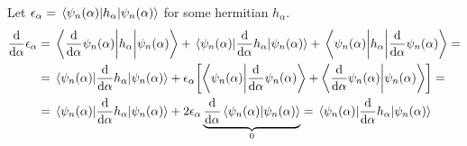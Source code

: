 \begin{theorem}
	Let $\epsilon_\alpha = \ev{h_\alpha}{\psi_n(\alpha)}$ for some hermitian $h_\alpha$.
	\begin{align}
	\dv{\alpha} \epsilon_\alpha  &=  \mel{\dv{\alpha}\psi_n(\alpha)}{h_\alpha}{\psi_n(\alpha)} + \mel{\psi_n(\alpha)}{\dv{\alpha}h_\alpha}{\psi_n(\alpha)} + \mel{\psi_n(\alpha)}{h_\alpha}{\dv{\alpha}\psi_n(\alpha)} =\\&= \mel{\psi_n(\alpha)}{\dv{\alpha}h_\alpha}{\psi_n(\alpha)} + \epsilon_{\alpha}\qty[\braket{\psi_n(\alpha)}{\dv{\alpha}\psi_n(\alpha)}+\braket{\dv{\alpha}\psi_n(\alpha)}{\psi_n(\alpha)}] =\\&= \mel{\psi_n(\alpha)}{\dv{\alpha}h_\alpha}{\psi_n(\alpha)} + 2\epsilon_{\alpha}\underbrace{\dv{\alpha}\braket{\psi_n(\alpha)}{\psi_n(\alpha)}}_0 = \mel{\psi_n(\alpha)}{\dv{\alpha}h_\alpha}{\psi_n(\alpha)}
	\end{align}
\end{theorem}
